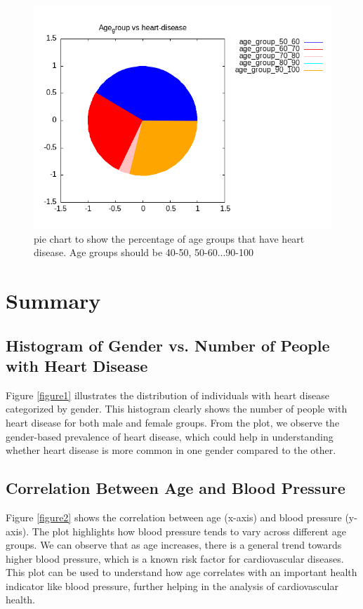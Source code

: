 \documentclass{article}
\begin{document}
\begin{figure}[H]
	\centering
	\includegraphics{question4_d.png}
	\caption{pie chart to show the percentage of age groups that have heart
		disease. Age groups should be 40-50, 50-60...90-100}
	\label{figure4}
\end{figure}
\section{Summary}
	\subsection{ Histogram of Gender vs. Number of People with Heart Disease}
	
	Figure \ref{figure1} illustrates the distribution of individuals with heart disease categorized by gender. This histogram clearly shows the number of people with heart disease for both male and female groups. From the plot, we observe the gender-based prevalence of heart disease, which could help in understanding whether heart disease is more common in one gender compared to the other.
	
	\subsection{Correlation Between Age and Blood Pressure}
	
	Figure \ref{figure2} shows the correlation between age (x-axis) and blood pressure (y-axis). The plot highlights how blood pressure tends to vary across different age groups. We can observe that as age increases, there is a general trend towards higher blood pressure, which is a known risk factor for cardiovascular diseases. This plot can be used to understand how age correlates with an important health indicator like blood pressure, further helping in the analysis of cardiovascular health.
	
\end{document}
